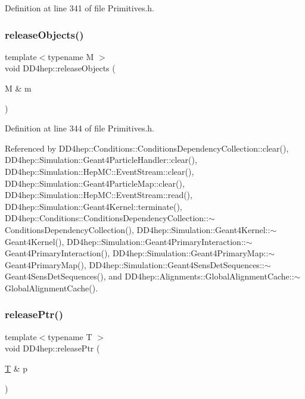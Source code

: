 Definition at line 341 of file Primitives.\+h.

\hypertarget{namespace_d_d4hep_af72014aac51cad36a418913e989a34fe}{}\label{namespace_d_d4hep_af72014aac51cad36a418913e989a34fe} 
\subsubsection{\texorpdfstring{release\+Objects()}{releaseObjects()}}
{\footnotesize\ttfamily template$<$typename M $>$ \\
void D\+D4hep\+::release\+Objects (\begin{DoxyParamCaption}\item[{M \&}]{m }\end{DoxyParamCaption})}



Definition at line 344 of file Primitives.\+h.



Referenced by D\+D4hep\+::\+Conditions\+::\+Conditions\+Dependency\+Collection\+::clear(), D\+D4hep\+::\+Simulation\+::\+Geant4\+Particle\+Handler\+::clear(), D\+D4hep\+::\+Simulation\+::\+Hep\+M\+C\+::\+Event\+Stream\+::clear(), D\+D4hep\+::\+Simulation\+::\+Geant4\+Particle\+Map\+::clear(), D\+D4hep\+::\+Simulation\+::\+Hep\+M\+C\+::\+Event\+Stream\+::read(), D\+D4hep\+::\+Simulation\+::\+Geant4\+Kernel\+::terminate(), D\+D4hep\+::\+Conditions\+::\+Conditions\+Dependency\+Collection\+::$\sim$\+Conditions\+Dependency\+Collection(), D\+D4hep\+::\+Simulation\+::\+Geant4\+Kernel\+::$\sim$\+Geant4\+Kernel(), D\+D4hep\+::\+Simulation\+::\+Geant4\+Primary\+Interaction\+::$\sim$\+Geant4\+Primary\+Interaction(), D\+D4hep\+::\+Simulation\+::\+Geant4\+Primary\+Map\+::$\sim$\+Geant4\+Primary\+Map(), D\+D4hep\+::\+Simulation\+::\+Geant4\+Sens\+Det\+Sequences\+::$\sim$\+Geant4\+Sens\+Det\+Sequences(), and D\+D4hep\+::\+Alignments\+::\+Global\+Alignment\+Cache\+::$\sim$\+Global\+Alignment\+Cache().

\hypertarget{namespace_d_d4hep_a80530363d2dcb2990f1ebacbfb69b789}{}\label{namespace_d_d4hep_a80530363d2dcb2990f1ebacbfb69b789} 
\subsubsection{\texorpdfstring{release\+Ptr()}{releasePtr()}}
{\footnotesize\ttfamily template$<$typename T $>$ \\
void D\+D4hep\+::release\+Ptr (\begin{DoxyParamCaption}\item[{\hyperlink{class_t}{T} \&}]{p }\end{DoxyParamCaption})\hspace{0.3cm}{\ttfamily [inline]}}



